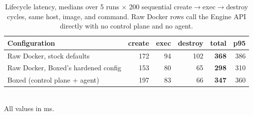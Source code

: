 \begin{table}[t]
\centering
\caption{Lifecycle latency, medians over 5 runs $\times$ 200 sequential create$\rightarrow$exec$\rightarrow$destroy cycles, same host, image, and command. Raw Docker rows call the Engine API directly with no control plane and no agent.}
\label{tab:lifecycle-linux}
\footnotesize
\begin{tabular}{@{}lrrrrr@{}}
\toprule
Configuration & create & exec & destroy & total & p95 \\
\midrule
Raw Docker, stock defaults & 172 & 94 & 102 & \textbf{368} & 386 \\
Raw Docker, Boxed's hardened config & 153 & 80 & 65 & \textbf{298} & 310 \\
Boxed (control plane + agent) & 197 & 83 & 66 & \textbf{347} & 360 \\
\bottomrule
\end{tabular}
\\[2pt]{\footnotesize All values in ms.}
\end{table}
